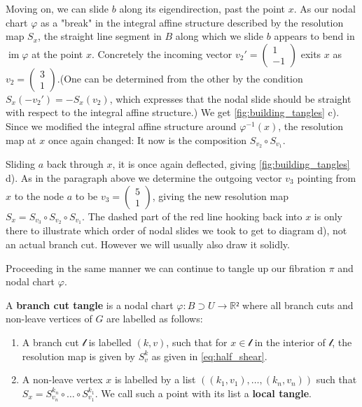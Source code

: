 \documentclass[12pt,a4paper,abstract=true,draft]{scrartcl}
\DeclareMathOperator{\im}{im}
\newcommand\mqty[1]{\begin{pmatrix}#1\end{pmatrix}}
\begin{document}
\begin{example}
  Moving on, we can slide $b$ along its eigendirection, past the point $x$.
  As our nodal chart $φ$ as a "break" in the integral affine structure described by the resolution map $S_x$, the straight line segment in $B$ along which we slide $b$ appears to bend in $\im φ$ at the point $x$.
  Concretely the incoming vector $v_2' = \mqty{1\\-1}$ exits $x$ as $v_2 = \mqty{3\\1}$.(One can be determined from the other by the condition $S_x(-v_2') = -S_x(v_2)$, which expresses that the nodal slide should be straight with respect to the integral affine structure.)
  We get \cref{fig:building_tangles} c).
  Since we modified the integral affine structure around $φ^{-1}(x)$, the resolution map at $x$ once again changed: It now is the composition $S_{v_2} ∘ S_{v_1}$.

  Sliding $a$ back through $x$, it is once again deflected, giving \cref{fig:building_tangles} d).
As in the paragraph above we determine the outgoing vector $v_3$ pointing from $x$ to the node $a$ to be $v_3 = \mqty{5\\1}$, giving the new resolution map $S_x = S_{v_3} ∘ S_{v_2} ∘ S_{v_1}$.
  The dashed part of the red line hooking back into $x$ is only there to illustrate which order of nodal slides we took to get to diagram d), not an actual branch cut.
  However we will usually also draw it solidly.
  
  Proceeding in the same manner we can continue to tangle up our fibration $π$ and nodal chart $φ$.
\end{example}



\begin{definition}
  A \textbf{branch cut tangle} is a nodal chart $φ \colon B ⊃ U → ℝ²$ where all branch cuts and non-leave vertices of $G$ are labelled as follows:
  \begin{enumerate}
    \item A branch cut $𝓁$ is labelled $(k,v)$, such that for $x ∈ 𝓁$ in the interior of $𝓁$, the resolution map is given by $S^k_v$ as given in \eqref{eq:half_shear}.
    \item A non-leave vertex $x$ is labelled by a list $((k_1,v_1), …, (k_n,v_n))$ such that $S_x = S^{k_n}_{v_n} ∘ … ∘ S^{k_1}_{v_1}$.
      We call such a point with its list a \textbf{local tangle}.
  \end{enumerate}
\end{definition}
\end{document}
